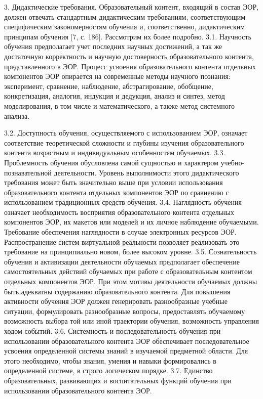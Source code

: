 3. Дидактические требования.
Образовательный контент, входящий в состав ЭОР, должен отвечать стандартным дидактическим требованиям, соответствующим специфическим закономерностям обучения и, соответственно, дидактическим принципам обучения [7, с. 186]. Рассмотрим их более подробно.
3.1. Научность обучения предполагает учет последних научных достижений, а так же достаточную корректность и научную достоверность образовательного контента, представленного в ЭОР. Процесс усвоения образовательного контента отдельных компонентов ЭОР опирается на современные методы научного познания: эксперимент, сравнение, наблюдение, абстрагирование, обобщение, конкретизация, аналогия, индукция и дедукция, анализ и синтез, метод моделирования, в том числе и математического, а также метод системного анализа. 

3.2. Доступность обучения, осуществляемого с использованием ЭОР, означает соответствие теоретической сложности и глубины изучения образовательного контента возрастным и индивидуальным особенностям обучаемых.
3.3. Проблемность обучения обусловлена самой сущностью и характером учебно-познавательной деятельности. Уровень выполнимости этого дидактического требования может быть значительно выше при условии использования образовательного контента отдельных компонентов ЭОР по сравнению с использованием традиционных средств обучения.
3.4. Наглядность обучения означает необходимость восприятия образовательного контента отдельных компонентов ЭОР, их макетов или моделей и их личное наблюдение обучаемыми. Требование обеспечения наглядности в случае электронных ресурсов ЭОР. Распространение систем виртуальной реальности позволяет реализовать это требование на принципиально новом, более высоком уровне.
3.5. Сознательность обучения и активизации деятельности обучаемых предполагает обеспечение самостоятельных действий обучаемых при работе с образовательным контентом отдельных компонентов ЭОР. При этом мотивы деятельности обучаемых должны быть адекватны содержанию образовательного контента. Для повышения активности обучения ЭОР должен генерировать разнообразные учебные ситуации, формулировать разнообразные вопросы, предоставлять обучаемому возможность выбора той или иной траектории обучения, возможность управления ходом событий.
3.6. Системность и последовательность обучения при использовании
образовательного контента ЭОР обеспечивает последовательное усвоения
определенной системы знаний в изучаемой предметной области. Для этого
необходимо, чтобы знания, умения и навыки формировались в определенной системе, в строго логическом порядке.
3.7. Единство образовательных, развивающих и воспитательных функций обучения при использовании образовательного контента ЭОР.
